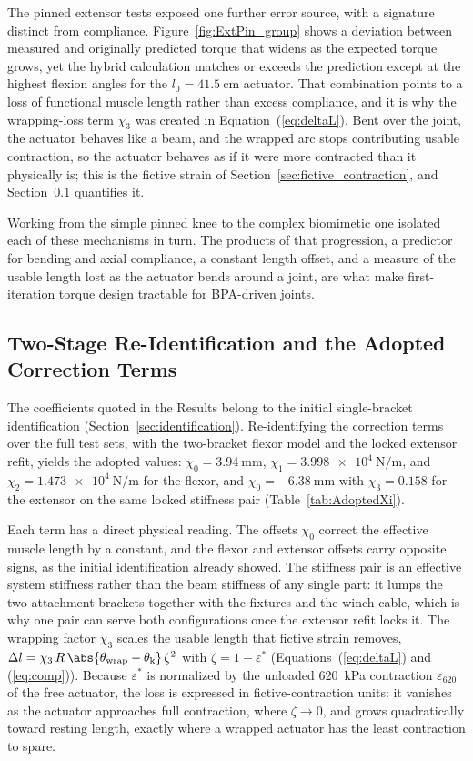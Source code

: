 The pinned extensor tests exposed one further error source, with a signature distinct from compliance. Figure~\ref{fig:ExtPin_group} shows a deviation between measured and originally predicted torque that widens as the expected torque grows, yet the hybrid calculation matches or exceeds the prediction except at the highest flexion angles for the $l_{0}=\qty{41.5}{\cm}$ actuator. That combination points to a loss of functional muscle length rather than excess compliance, and it is why the wrapping-loss term $\chi_{3}$ was created in Equation~(\ref{eq:deltaL}). Bent over the joint, the actuator behaves like a beam, and the wrapped arc stops contributing usable contraction, so the actuator behaves as if it were more contracted than it physically is; this is the fictive strain of Section~\ref{sec:fictive_contraction}, and Section~\ref{sec:adopted_identification} quantifies it.

Working from the simple pinned knee to the complex biomimetic one isolated each of these mechanisms in turn. The products of that progression, a predictor for bending and axial compliance, a constant length offset, and a measure of the usable length lost as the actuator bends around a joint, are what make first-iteration torque design tractable for BPA-driven joints.

\subsection{Two-Stage Re-Identification and the Adopted Correction Terms}\label{sec:adopted_identification}

The coefficients quoted in the Results belong to the initial single-bracket identification (Section~\ref{sec:identification}). Re-identifying the correction terms over the full test sets, with the two-bracket flexor model and the locked extensor refit, yields the adopted values: $\chi_{0} = \qty{+3.94}{\mm}$, $\chi_{1} = \qty{3.998e4}{\N\per\m}$, and $\chi_{2} = \qty{1.473e4}{\N\per\m}$ for the flexor, and $\chi_{0} = \qty{-6.38}{\mm}$ with $\chi_{3} = 0.158$ for the extensor on the same locked stiffness pair (Table~\ref{tab:AdoptedXi}).

Each term has a direct physical reading. The offsets $\chi_{0}$ correct the effective muscle length by a constant, and the flexor and extensor offsets carry opposite signs, as the initial identification already showed. The stiffness pair is an effective system stiffness rather than the beam stiffness of any single part: it lumps the two attachment brackets together with the fixtures and the winch cable, which is why one pair can serve both configurations once the extensor refit locks it. The wrapping factor $\chi_{3}$ scales the usable length that fictive strain removes, $\Delta l = \chi_{3}\, R\, \abs{\theta_{\text{wrap}} - \theta_{\text{k}}}\, \zeta^{2}$ with $\zeta = 1 - \varepsilon^{*}$ (Equations~(\ref{eq:deltaL}) and (\ref{eq:comp})). Because $\varepsilon^{*}$ is normalized by the unloaded \qty{620}{\kPa} contraction $\varepsilon_{620}$ of the free actuator, the loss is expressed in fictive-contraction units: it vanishes as the actuator approaches full contraction, where $\zeta \to 0$, and grows quadratically toward resting length, exactly where a wrapped actuator has the least contraction to spare.

